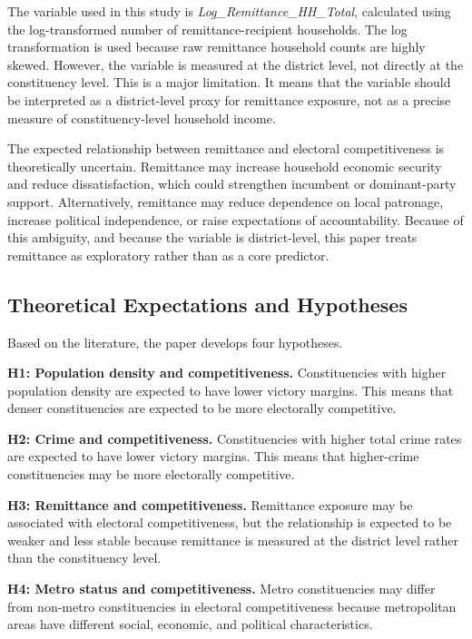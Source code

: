 \documentclass[12pt,a4paper]{article}
\begin{document}
The variable used in this study is \textit{Log\_Remittance\_HH\_Total}, calculated using the log-transformed number of remittance-recipient households. The log transformation is used because raw remittance household counts are highly skewed. However, the variable is measured at the district level, not directly at the constituency level. This is a major limitation. It means that the variable should be interpreted as a district-level proxy for remittance exposure, not as a precise measure of constituency-level household income.

The expected relationship between remittance and electoral competitiveness is theoretically uncertain. Remittance may increase household economic security and reduce dissatisfaction, which could strengthen incumbent or dominant-party support. Alternatively, remittance may reduce dependence on local patronage, increase political independence, or raise expectations of accountability. Because of this ambiguity, and because the variable is district-level, this paper treats remittance as exploratory rather than as a core predictor.

\subsection{Theoretical Expectations and Hypotheses}

Based on the literature, the paper develops four hypotheses.

\textbf{H1: Population density and competitiveness.} Constituencies with higher population density are expected to have lower victory margins. This means that denser constituencies are expected to be more electorally competitive.

\textbf{H2: Crime and competitiveness.} Constituencies with higher total crime rates are expected to have lower victory margins. This means that higher-crime constituencies may be more electorally competitive.

\textbf{H3: Remittance and competitiveness.} Remittance exposure may be associated with electoral competitiveness, but the relationship is expected to be weaker and less stable because remittance is measured at the district level rather than the constituency level.

\textbf{H4: Metro status and competitiveness.} Metro constituencies may differ from non-metro constituencies in electoral competitiveness because metropolitan areas have different social, economic, and political characteristics.
\end{document}
